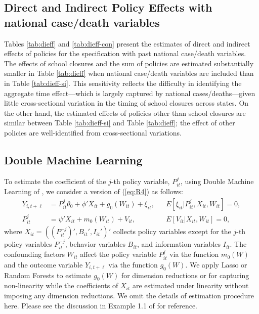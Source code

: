 \documentclass[11pt,reqno,letter]{amsart}
\theoremstyle{definition}
\begin{document}
\FloatBarrier

\subsection{Direct and Indirect Policy Effects with national case/death variables}
Tables \ref{tab:dieff} and \ref{tab:dieff-con}  present  the estimates of direct and indirect effects of policies for the specification with past national case/death variables. The effects of school closures and  the sum of policies are estimated substantially smaller in Table \ref{tab:dieff} when national case/death variables are included than in Table \ref{tab:dieff-si}. This sensitivity reflects the difficulty in identifying the aggregate time effect---which is largely captured by national cases/deaths---given little cross-sectional variation in the timing of school closures across states. On the other hand, the estimated effects of policies other than school closures are similar between Table \ref{tab:dieff-si} and Table \ref{tab:dieff}; the effect of other policies are well-identified from cross-sectional variations.



\subsection{Double Machine Learning}


To estimate the coefficient of the $j$-th policy variable, $P_{it}^j$, using Double Machine Learning of \cite{chernozhukov18}, we consider a version of (\ref{eq:R4}) as follows:
\begin{align*}
Y_{i,t+\ell} & = P_{it}^j \theta_0 + \phi' X_{it} + g_0(W_{it}) + \xi_{it}, && E[\xi_{it}|P_{it}^j,X_{it},W_{it}]=0,\\
P_{it}^j &= \psi' X_{it} +m_0(W_{it}) +V_{it},&& E[V_{it}|X_{it},W_{it}]=0,
\end{align*}
where $X_{it}=((P_{it}^{-j})',B_{it}',I_{it}')'$ collects  policy variables except for the $j$-th policy variables $P_{it}^{-j}$, behavior variables $B_{it}$, and information variables $I_{it}$. The confounding factors $W_{it}$ affect the policy variable $P_{it}^j$ via the function $m_0(W)$ and the outcome variable $Y_{i,t+\ell}$ via the function $g_0(W)$. We apply Lasso  or  Random Forests to estimate $g_0(W)$  for dimension reductions or for capturing non-linearity while the coefficients of $X_{it}$ are estimated under linearity without imposing any dimension reductions.  We omit the details of estimation procedure here. Please see the discussion in Example 1.1 of  \cite{chernozhukov18} for reference.
\end{document}
